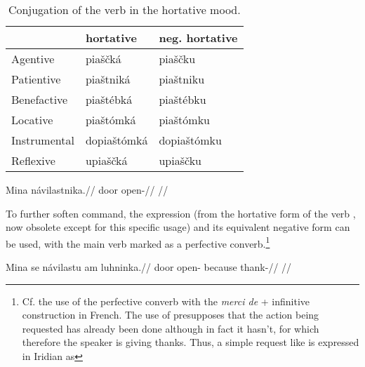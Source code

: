 \begin{table}[ht!]
    \footnotesize\sffamily
		\caption{Conjugation of the verb  in the hortative mood.}
		\label{tbl:hortative}
		\medskip
    \begin{tabu}to 0.7
         \toprule

         &{\sc hortative}&{\sc neg. hortative}  \\
         \midrule
         Agentive &
         {piaščká} &
         {piaščku}\\

         Patientive &
         {piaštniká} &
         {piaštniku}\\

         Benefactive &
         {piaštébká} &
         {piaštébku}\\

         Locative &
         {piaštómká} &
         {piaštómku}\\

         Instrumental &
         {dopiaštómká} &
         {dopiaštómku}\\

         Reflexive &
         {upiaščká} &
         {upiaščku}\\

         \bottomrule
    \end{tabu}

\end{table}

\pex
\begingl
\gla Mina návilastnika.//
\glb door open-//
\glft {}//
\endgl
\xe

To further soften command, the expression  (from the hortative
form of the verb , now obsolete except for this
specific usage) and its equivalent negative form  can be used,
with the main verb marked as a perfective converb.\footnote{Cf. the use of the perfective converb with the \textit{merci de} + infinitive construction in French. The use of  presupposes that the action being requested has already been done although in fact it hasn't, for which therefore the speaker is giving thanks. Thus, a simple request like  is expressed in Iridian as }

\pex
\begingl
\gla Mina se návilastu am luhninka.//
\glb door \Refl{} open- because thank-//
\glft {}//
\endgl
\xe

